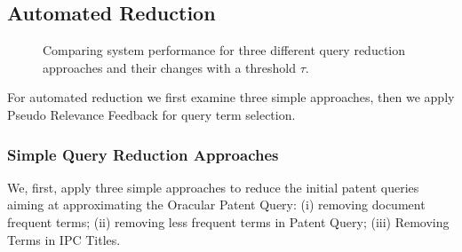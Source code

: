\subsection{Automated Reduction}
\begin{figure}[t!]
\begin{centering}
 \hspace*{1.5cm}  
\par\end{centering} 
\protect\caption{Comparing system performance for three different query reduction approaches and their changes with a threshold $\tau$.}
\label{fig:combinedapproach}
\end{figure}
\label{AutomatedReduction}
For automated reduction we first examine three simple approaches, then we apply Pseudo Relevance Feedback for query term selection.  
\subsubsection{Simple Query Reduction Approaches}
\label{SimpleApproaches}
We, first, apply three simple approaches to reduce the initial patent queries aiming at approximating the Oracular Patent Query: (i) removing document frequent terms; (ii) removing less frequent terms in Patent Query; (iii) Removing Terms in IPC Titles.
